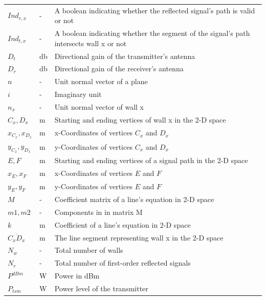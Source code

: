 \documentclass[12pt]{article}
\begin{document}
\begin{longtable*}{l l p{12cm}}
\\
$Ind_{r,x}$ & \si[per-mode=symbol] {-} & A boolean indicating whether the reflected signal's path is valid or not
\\
$Ind_{t,x}$ & \si[per-mode=symbol] {-} & A boolean indicating whether the segment of the signal's path intersects wall x or not
\\
$D_t$ & \si[per-mode=symbol] {\decibel} & Directional gain of the transmitter's antenna
\\
$D_r$ & \si[per-mode=symbol] {\decibel} & Directional gain of the receiver's antenna
\\
$n$ & \si[per-mode=symbol] {-} & Unit normal vector of a plane
\\
$i$ & \si[per-mode=symbol] {-} & Imaginary unit
\\
$n_x$ & \si[per-mode=symbol] {-} & Unit normal vector of wall x
\\
$C_x, D_x$ & \si[per-mode=symbol] {\metre} & Starting and ending vertices of wall x in the 2-D space
\\
$x_{C_x},x_{D_x}$ & \si[per-mode=symbol] {\metre} & x-Coordinates of vertices $C_x$ and $D_x$
\\
$y_{C_x},y_{D_x}$ & \si[per-mode=symbol] {\metre} & y-Coordinates of vertices $C_x$ and $D_x$
\\
$E, F$ & \si[per-mode=symbol] {\metre} & Starting and ending vertices of a signal path 
in the 2-D space
\\
$x_{E},x_{F}$ & \si[per-mode=symbol] {\metre} & x-Coordinates of vertices $E$ and $F$
\\
$y_{E},y_{F}$ & \si[per-mode=symbol] {\metre} & y-Coordinates of vertices $E$ and $F$
\\
$M$ & \si[per-mode=symbol] {-} & Coefficient matrix of a line's equation in 2-D space
\\
$m1,m2$ & \si[per-mode=symbol] {-} & Components in in matrix M
\\
$k$ & \si[per-mode=symbol] {\meter} & Coefficient of a line's equation in 2-D space
\\
$\overline{C_x D_x}$ & \si[per-mode=symbol] {\metre} & The line segment representing 
wall x in the 2-D space
\\
$N_w$ & \si[per-mode=symbol] {-} & Total number of walls
\\
$N_r$ & \si[per-mode=symbol] {-} & Total number of first-order reflected signals
\\
$P^{dBm}$ & \si[per-mode=symbol] {\watt} & Power in dBm
\\
$P_{tsm}$ & \si[per-mode=symbol] {\watt} & Power level of the transmitter

\end{longtable*}
\end{document}
